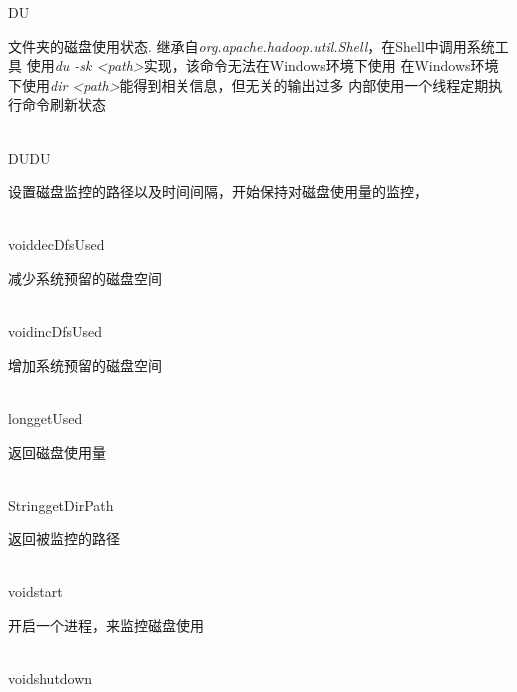 \begin{XeClass}{DU}
   
 文件夹的磁盘使用状态.
 继承自\emph{org.apache.hadoop.util.Shell}，在Shell中调用系统工具
 使用\emph{du -sk <path>}实现，该命令无法在Windows环境下使用
 在Windows环境下使用\emph{dir <path>}能得到相关信息，但无关的输出过多
 内部使用一个线程定期执行命令刷新状态

  \begin{XeMethod}{\XePublic\\ }{DU}{DU}
       
 设置磁盘监控的路径以及时间间隔，开始保持对磁盘使用量的监控，

  \end{XeMethod}

  \begin{XeMethod}{\XePublic\\ }{void}{decDfsUsed}
       
 减少系统预留的磁盘空间

  \end{XeMethod}

  \begin{XeMethod}{\XePublic\\ }{void}{incDfsUsed}
       
 增加系统预留的磁盘空间

  \end{XeMethod}

  \begin{XeMethod}{\XePublic\\ }{long}{getUsed}
       
 返回磁盘使用量

  \end{XeMethod}

  \begin{XeMethod}{\XePublic\\ }{String}{getDirPath}
       
 返回被监控的路径

  \end{XeMethod}

  \begin{XeMethod}{\XePublic\\ }{void}{start}
       
 开启一个进程，来监控磁盘使用

  \end{XeMethod}

  \begin{XeMethod}{\XePublic\\ }{void}{shutdown}
       

\end{XeMethod}
\end{XeClass}
